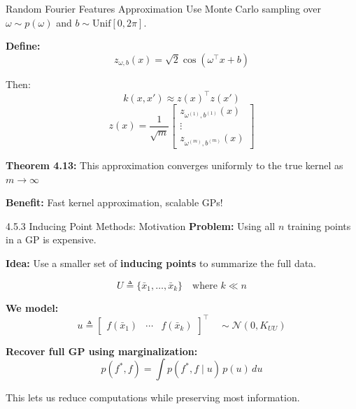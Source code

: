 \documentclass[handout,aspectratio=169]{beamer}
\begin{document}
\begin{frame}{Random Fourier Features Approximation}
Use Monte Carlo sampling over $\omega \sim p(\omega)$ and $b \sim \text{Unif}[0, 2\pi]$.

\textbf{Define:}
\[
z_{\omega, b}(x) = \sqrt{2} \cos(\omega^\top x + b)
\]

Then:
\[
k(x, x') \approx z(x)^\top z(x') \tag{4.42}
\]
\[
z(x) = \frac{1}{\sqrt{m}} \begin{bmatrix}
z_{\omega^{(1)}, b^{(1)}}(x) \\
\vdots \\
z_{\omega^{(m)}, b^{(m)}}(x)
\end{bmatrix} \tag{4.43}
\]

\vspace{0.3cm}
\textbf{Theorem 4.13:} This approximation converges uniformly to the true kernel as $m \to \infty$

\textbf{Benefit:} Fast kernel approximation, scalable GPs!
\end{frame}

\begin{frame}{4.5.3 Inducing Point Methods: Motivation}
\textbf{Problem:} Using all $n$ training points in a GP is expensive.

\vspace{0.2cm}
\textbf{Idea:} Use a smaller set of \textbf{inducing points} to summarize the full data.

\[
U \triangleq \{\bar{x}_1, \dots, \bar{x}_k\}
\quad \text{where } k \ll n
\]

\vspace{0.3cm}
\textbf{We model:}
\[
u \triangleq \begin{bmatrix} f(\bar{x}_1) & \cdots & f(\bar{x}_k) \end{bmatrix}^\top
\quad \sim \mathcal{N}(0, K_{UU})
\]

\vspace{0.3cm}
\textbf{Recover full GP using marginalization:}
\[
p(f^*, f) = \int p(f^*, f \mid u) \, p(u) \, du \tag{4.45}
\]

\pause
This lets us reduce computations while preserving most information.
\end{frame}
\end{document}
